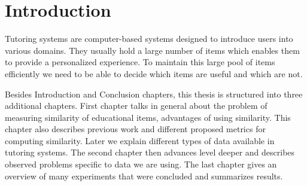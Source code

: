 \documentclass[
  digital, %
  table,   %
  nolof,     %
  nolot,     %
  nocover
]{fithesis3}
\begin{document}
%
%
%
%
%
%

\chapter*{Introduction}



Tutoring systems are computer-based systems designed to introduce users into various domains. They usually hold a large number of items which enables them to provide a personalized experience. To maintain this large
pool of items efficiently we need to be able to decide which items are
useful and which are not.





Besides Introduction and Conclusion chapters, this thesis is structured
into three additional chapters. First chapter talks in general about the problem of measuring similarity of educational items, advantages of using similarity.
This chapter also describes previous work and different proposed metrics for computing similarity. Later we explain different types of data available in tutoring systems.
The second chapter then advances level deeper and describes observed problems specific to data we are using.
The last chapter gives an overview of many experiments that were concluded and summarizes results.
\end{document}
